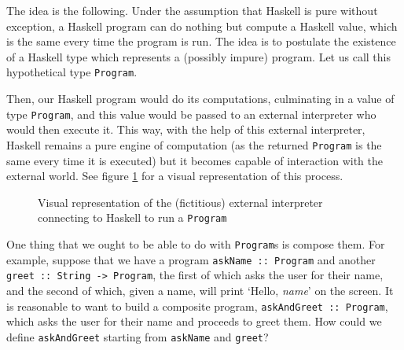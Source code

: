 \documentclass[11pt]{article}
\theoremstyle{nonumberplain}
\newcommand*\lsin{\lstinline}
\begin{document}
The idea is the following. Under the assumption that Haskell is pure without exception, a Haskell program can do nothing but compute a Haskell value, which is the same every time the program is run. The idea is to postulate the existence of a Haskell type which represents a (possibly impure) program. Let us call this hypothetical type \lsin|Program|.

Then, our Haskell program would do its computations, culminating in a value of type \lsin|Program|, and this value would be passed to an external interpreter who would then execute it. This way, with the help of this external interpreter, Haskell remains a pure engine of computation (as the returned \lsin|Program| is the same every time it is executed) but it becomes capable of interaction with the external world. See figure \ref{fig:program} for a visual representation of this process.

\begin{figure}
\centering
{}
\caption{Visual representation of the (fictitious) external interpreter connecting to Haskell to run a \lsin|Program|}\label{fig:program}
\end{figure}

One thing that we ought to be able to do with \lsin|Program|s is compose them. For example, suppose that we have a program \lsin|askName :: Program| and another \lsin|greet :: String -> Program|, the first of which asks the user for their name, and the second of which, given a name, will print `Hello, \textit{name}' on the screen. It is reasonable to want to build a composite program, \lsin|askAndGreet :: Program|, which asks the user for their name and proceeds to greet them. How could we define \lsin|askAndGreet| starting from \lsin|askName| and \lsin|greet|?
\end{document}
